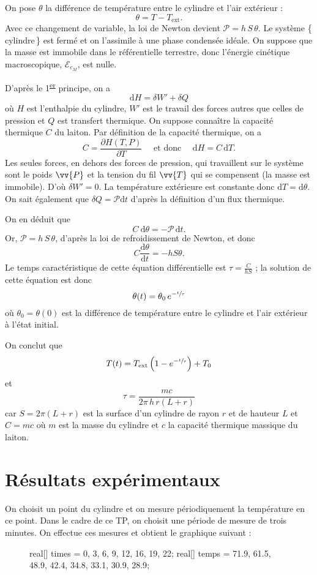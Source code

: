 \documentclass[a4paper]{report}
\newcommand{\tsup}[1]{\textsuperscript{\underline{#1}}}
\let\vec\vv
\begin{document}
\begin{multicols}{2}
		On pose $\theta$ la différence de température entre le cylindre et l'air extérieur : \[
			\theta = T - T_{\text{ext}}
		.\] Avec ce changement de variable, la loi de Newton devient $\mathcal{P} = h\,S\,\theta$. Le système \{\,cylindre\,\} est fermé et on l'assimile à une phase condensée idéale. On suppose que la masse est immobile dans le référentielle terrestre, donc l'énergie cinétique macroscopique, $\mathcal{E}_{c_M}$, est nulle.

		D'après le 1\tsup{er} principe, on a \[
			\mathrm{d}H = \delta W' + \delta Q
		\] où $H$ est l'enthalpie du cylindre, $W'$ est le travail des forces autres que celles de pression et $Q$ est transfert thermique. On suppose connaître la capacité thermique $C$ du laiton. Par définition de la capacité thermique, on a \[
			C = \frac{\partial H(T,P)}{\partial T} \quad \text{ et donc } \quad \mathrm{d}H = C\,\mathrm{d}T
		.\] Les seules forces, en dehors des forces de pression, qui travaillent sur le système sont le poids $\vec{P}$ et la tension du fil $\vec{T}$ qui se compensent (la masse est immobile). D'où $\delta W' = 0$. La température extérieure est constante donc $\mathrm{d}T = \mathrm{d}\theta$. On sait également que $\delta Q = \mathcal{P} \mathrm{d}t$ d'après la définition d'un flux thermique.

		On en déduit que \[
			C\: \mathrm{d}\theta = -\mathcal{P}\,\mathrm{d}t
		.\] Or, $\mathcal{P} = h\,S\,\theta$, d'après la loi de refroidissement de Newton, et donc \[
			C \frac{\mathrm{d}\theta}{\mathrm{d}t} = - h S \theta
		.\] Le temps caractéristique de cette équation différentielle est $\tau = \frac{C}{hS}$ ; la solution de cette équation est donc \[
			\theta(t) = \theta_0\,e^{-\sfrac{t}{\tau}}
		\] où $\theta_0 = \theta(0)$ est la différence de température entre le cylindre et l'air extérieur à l'état initial.

		On conclut que \[
			T(t) = T_\text{ext} \left( 1 - e^{-\sfrac{t}{\tau}}\right) + T_0
		\] et \[
			\tau = \frac{mc}{2\pi\,h\,r(L + r)}
		\] car $S = 2\pi (L + r)$ est la surface d'un cylindre de rayon $r$ et de hauteur $L$ et $C = m c$ où $m$ est la masse du cylindre et $c$ la capacité thermique massique du laiton.

		\section{Résultats expérimentaux}

		On choisit un point du cylindre et on mesure périodiquement la température en ce point. Dans le cadre de ce TP, on choisit une période de mesure de trois minutes. On effectue ces mesures et obtient le graphique suivant :
		\begin{figure}[H]
			\centering
			\begin{asy}
				real[] times = {0, 3, 6, 9, 12, 16, 19, 22};
				real[] temps = {71.9, 61.5, 48.9, 42.4, 34.8, 33.1, 30.9, 28.9};


\end{asy}
\end{figure}
\end{multicols}
\end{document}
